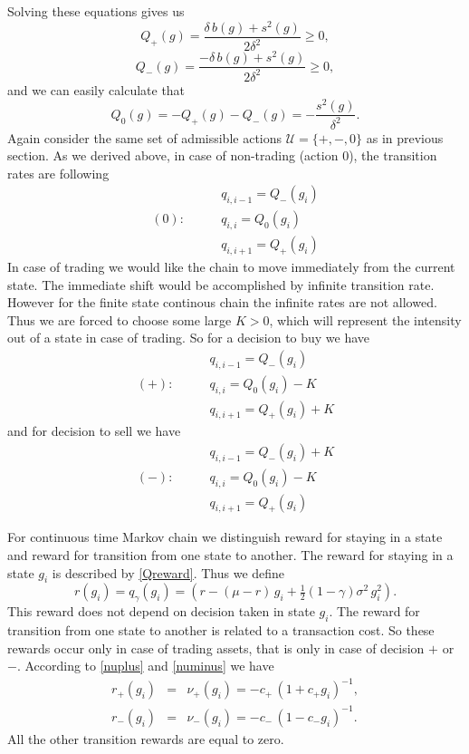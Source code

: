 Solving these equations gives us
\begin{equation*}
Q_{+}(g)=\frac{\delta\,b(g)+s^2(g)}{2\delta^2}\geq0,
\end{equation*}
\begin{equation*}
Q_{-}(g)=\frac{-\delta\,b(g)+s^2(g)}{2\delta^2}\geq0,
\end{equation*}
and we can easily calculate that
\begin{equation*}
Q_0(g)=-Q_{+}(g)-Q_{-}(g)=-\frac{s^2(g)}{\delta^2}.
\end{equation*}
Again consider the same set of admissible actions $\mathcal{U}=\{+,-,0\}$ as in previous section. As we derived above, in case of non-trading (action $0$), the transition rates are following
\begin{align*}
&\qquad q_{i,i-1}=Q_{-}(g_i)\\
(0):&\qquad q_{i,i}=Q_{0}(g_i)\\
&\qquad q_{i,i+1}=Q_{+}(g_i)
\end{align*}
In case of trading we would like the chain to move immediately from the current state. The immediate shift would be accomplished by infinite transition rate. However for the finite state continous chain the infinite rates are not allowed. Thus we are forced to choose some large $K>0$, which will represent the intensity out of a state in case of trading. So for a decision to buy we have
 \begin{align*}
&\qquad q_{i,i-1}=Q_{-}(g_i)\\
(+):&\qquad q_{i,i}=Q_{0}(g_i)-K\\
&\qquad q_{i,i+1}=Q_{+}(g_i)+K
\end{align*}
and for decision to sell we have
\begin{align*}
&\qquad q_{i,i-1}=Q_{-}(g_i)+K\\
(-):&\qquad q_{i,i}=Q_{0}(g_i)-K\\
&\qquad q_{i,i+1}=Q_{+}(g_i)
\end{align*}

For continuous time Markov chain we distinguish reward for staying in a state and reward for transition from one state to another. The reward for staying in a state $g_i$ is described by \eqref{Qreward}. Thus we define  %
\begin{equation*}
r(g_i)=q_\gamma(g_i)=(r-(\mu-r)\,g_i+\tfrac{1}{2}(1-\gamma)\sigma^2\,g_i^2).
\end{equation*}
This reward does not depend on decision taken in state $g_i$. The reward for transition from one state to another is related to a transaction cost. So these rewards occur only in case of trading assets, that is only in case of decision $+$ or $-$. According to  \eqref{nuplus} and \eqref{numinus} we have
\begin{eqnarray*}
r_+(g_i)&=&\nu_{+}(g_i)=-c_{+}\,(1+c_{+} g_i)^{-1},\\	
r_-(g_i)&=&\nu_{-}(g_i)=-c_{-}\,(1-c_{-} g_i)^{-1}.
\end{eqnarray*}
All the other transition rewards are equal to zero. 

